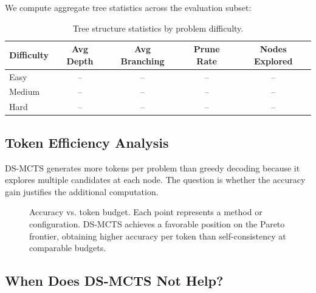 \documentclass[11pt,a4paper]{article}
\begin{document}
We compute aggregate tree statistics across the evaluation subset:

\begin{table}[h]
\centering
\caption{Tree structure statistics by problem difficulty.}
\label{tab:tree_stats}
\begin{tabular}{lcccc}
\toprule
\textbf{Difficulty} & \textbf{Avg Depth} & \textbf{Avg Branching} & \textbf{Prune Rate} & \textbf{Nodes Explored} \\
\midrule
Easy   & -- & -- & -- & -- \\
Medium & -- & -- & -- & -- \\
Hard   & -- & -- & -- & -- \\
\bottomrule
\end{tabular}
\end{table}


\subsection{Token Efficiency Analysis}

DS-MCTS generates more tokens per problem than greedy decoding because it
explores multiple candidates at each node. The question is whether the accuracy
gain justifies the additional computation.

\begin{figure}[h]
\centering
\caption{Accuracy vs. token budget. Each point represents a method or
configuration. DS-MCTS achieves a favorable position on the Pareto frontier,
obtaining higher accuracy per token than self-consistency at comparable budgets.}
\label{fig:efficiency}
\end{figure}


\subsection{When Does DS-MCTS Not Help?}
\end{document}
